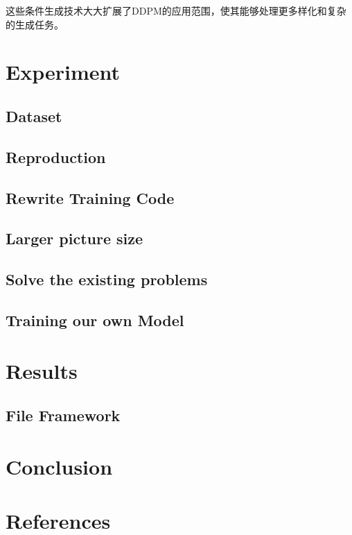 \documentclass{ctexart}
\begin{document}
\noindent
这些条件生成技术大大扩展了DDPM的应用范围，使其能够处理更多样化和复杂的生成任务。

\section{Experiment}

\subsection{Dataset}


\subsection{Reproduction}

\subsection{Rewrite Training Code}

\subsection{Larger picture size}

\subsection{Solve the existing problems}

\subsection{Training our own Model}

\section{Results}

\subsection{File Framework}


\section{Conclusion}


\section{References}

    
\end{document}
